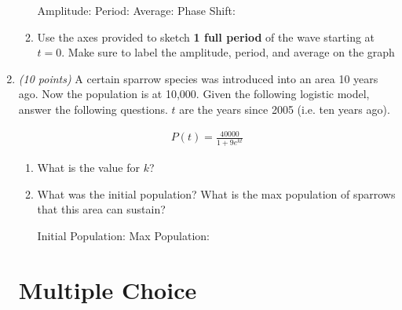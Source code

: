 \documentclass[fleqn]{article}
\renewcommand{\thispagestyle}[1]{}
\begin{document}
\begin{enumerate}
\begin{enumerate}
\vspace{1.25in}
Amplitude: \underline{\hspace{.7in}} \qquad Period: \underline{\hspace{.7in}} \qquad Average: \underline{\hspace{.7in}} \qquad Phase Shift: \underline{\hspace{.7in}}

\item Use the axes provided to sketch \textbf{1 full period} of the wave starting at $t = 0$.
Make sure to label the amplitude, period, and average on the graph \\

\end{enumerate}

\item \textit{(10 points)} A certain sparrow species was introduced into an area 10 years ago.  Now the population is at 10,000.  Given the following logistic model, answer the following questions.  $t$ are the years since 2005 (i.e. ten years ago).

\begin{align*}
P(t) = \frac{40000}{1+9e^{kt}}
\end{align*}

\begin{enumerate}
\item What is the value for $k$?
\vspace{1.25in}

\item What was the initial population? What is the max population of sparrows that this area can sustain?

\vspace{1in}

Initial Population: \underline{\hspace{1.5in}} \qquad Max Population: \underline{\hspace{1.5in}}

\end{enumerate}

\pagebreak
\thispagestyle{fancy}{
\lhead{}
}

\section*{Multiple Choice}


\end{enumerate}
\end{document}
